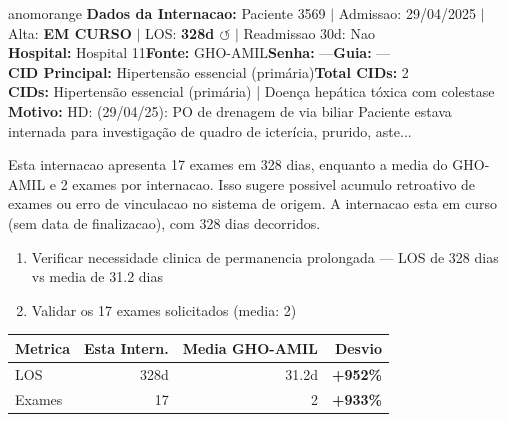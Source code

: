 \documentclass[a4paper,10pt]{article}
\begin{document}
\begin{anomalycard}[Internacao 3645 | GHO-AMIL | ALTO (z=4.43)]{anomorange}
\textbf{Dados da Internacao:} Paciente 3569 $\mid$ Admissao: 29/04/2025 $\mid$ Alta: \textcolor{anomorange}{\textbf{EM CURSO}} $\mid$ LOS: \textbf{328d \textcolor{anomorange}{$\circlearrowleft$}} $\mid$ Readmissao 30d: Nao\\
\textbf{Hospital:} Hospital 11\quad\textbf{Fonte:} GHO-AMIL\quad\textbf{Senha:} ---\quad\textbf{Guia:} ---\\
\textbf{CID Principal:} {\small Hipertensão essencial (primária)}\quad\textbf{Total CIDs:} 2\\

\textbf{CIDs:} {\scriptsize Hipertensão essencial (primária) | Doença hepática tóxica com colestase}\\

\textbf{Motivo:} {\scriptsize HD: (29/04/25): PO de drenagem de via biliar  Paciente estava internada para investigação de  quadro de icterícia, prurido, aste...}\\

\vspace{2pt}\begin{tcolorbox}[colback=severityred!20,colframe=anomorange,title={\textbf{Interpretacao de Negocio}},fonttitle=\bfseries\small,left=4pt,right=4pt,top=3pt,bottom=3pt]
{\small Esta internacao apresenta 17 exames em 328 dias, enquanto a media do GHO-AMIL e 2 exames por internacao. Isso sugere possivel acumulo retroativo de exames ou erro de vinculacao no sistema de origem. A internacao esta em curso (sem data de finalizacao), com 328 dias decorridos.}
\end{tcolorbox}
\begin{tcolorbox}[colback=severityyellow!30,colframe=anomorange,title={\textbf{Recomendacoes Especificas}},fonttitle=\bfseries\small,left=4pt,right=4pt,top=3pt,bottom=3pt]
\begin{enumerate}[nosep,leftmargin=16pt]
\item {\small Verificar necessidade clinica de permanencia prolongada --- LOS de 328 dias vs media de 31.2 dias}
\item {\small Validar os 17 exames solicitados (media: 2)}
\end{enumerate}
\end{tcolorbox}
\begin{center}\begin{tabular}{l r r r}\toprule\textbf{Metrica} & \textbf{Esta Intern.} & \textbf{Media GHO-AMIL} & \textbf{Desvio} \\\midrule
LOS & 328d & 31.2d & \textcolor{anomred}{\textbf{+952\%}} \\
Exames & 17 & 2 & \textcolor{anomred}{\textbf{+933\%}} \\
\bottomrule\end{tabular}\end{center}


\end{anomalycard}
\end{document}
